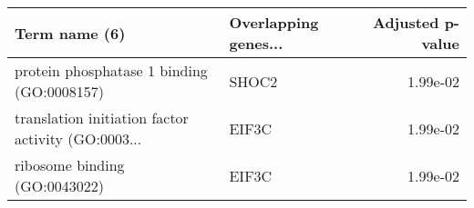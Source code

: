 \begin{tabular}{llr}
\toprule
                                     Term name (6) & Overlapping genes... &  Adjusted p-value \\
\midrule
        protein phosphatase 1 binding (GO:0008157) &                SHOC2 &          1.99e-02 \\
translation initiation factor activity (GO:0003... &                EIF3C &          1.99e-02 \\
                     ribosome binding (GO:0043022) &                EIF3C &          1.99e-02 \\
\bottomrule
\end{tabular}
